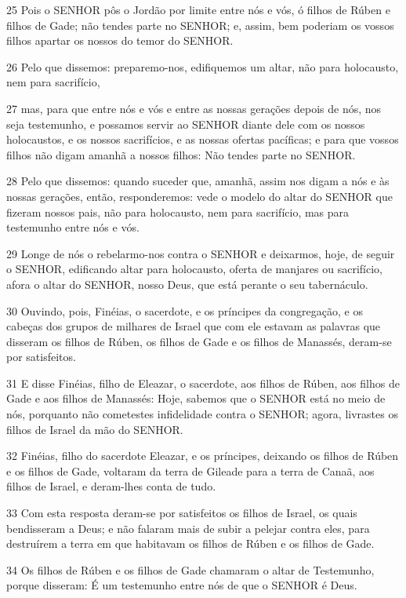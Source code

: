 \par 25 Pois o SENHOR pôs o Jordão por limite entre nós e vós, ó filhos de Rúben e filhos de Gade; não tendes parte no SENHOR; e, assim, bem poderiam os vossos filhos apartar os nossos do temor do SENHOR.
\par 26 Pelo que dissemos: preparemo-nos, edifiquemos um altar, não para holocausto, nem para sacrifício,
\par 27 mas, para que entre nós e vós e entre as nossas gerações depois de nós, nos seja testemunho, e possamos servir ao SENHOR diante dele com os nossos holocaustos, e os nossos sacrifícios, e as nossas ofertas pacíficas; e para que vossos filhos não digam amanhã a nossos filhos: Não tendes parte no SENHOR.
\par 28 Pelo que dissemos: quando suceder que, amanhã, assim nos digam a nós e às nossas gerações, então, responderemos: vede o modelo do altar do SENHOR que fizeram nossos pais, não para holocausto, nem para sacrifício, mas para testemunho entre nós e vós.
\par 29 Longe de nós o rebelarmo-nos contra o SENHOR e deixarmos, hoje, de seguir o SENHOR, edificando altar para holocausto, oferta de manjares ou sacrifício, afora o altar do SENHOR, nosso Deus, que está perante o seu tabernáculo.
\par 30 Ouvindo, pois, Finéias, o sacerdote, e os príncipes da congregação, e os cabeças dos grupos de milhares de Israel que com ele estavam as palavras que disseram os filhos de Rúben, os filhos de Gade e os filhos de Manassés, deram-se por satisfeitos.
\par 31 E disse Finéias, filho de Eleazar, o sacerdote, aos filhos de Rúben, aos filhos de Gade e aos filhos de Manassés: Hoje, sabemos que o SENHOR está no meio de nós, porquanto não cometestes infidelidade contra o SENHOR; agora, livrastes os filhos de Israel da mão do SENHOR.
\par 32 Finéias, filho do sacerdote Eleazar, e os príncipes, deixando os filhos de Rúben e os filhos de Gade, voltaram da terra de Gileade para a terra de Canaã, aos filhos de Israel, e deram-lhes conta de tudo.
\par 33 Com esta resposta deram-se por satisfeitos os filhos de Israel, os quais bendisseram a Deus; e não falaram mais de subir a pelejar contra eles, para destruírem a terra em que habitavam os filhos de Rúben e os filhos de Gade.
\par 34 Os filhos de Rúben e os filhos de Gade chamaram o altar de Testemunho, porque disseram: É um testemunho entre nós de que o SENHOR é Deus.

